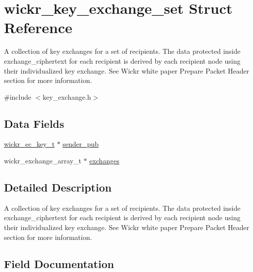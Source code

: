 \hypertarget{structwickr__key__exchange__set}{}\section{wickr\+\_\+key\+\_\+exchange\+\_\+set Struct Reference}
\label{structwickr__key__exchange__set}


A collection of key exchanges for a set of recipients. The data protected inside \textquotesingle{}exchange\+\_\+ciphertext\textquotesingle{} for each recipient is derived by each recipient node using their individualized key exchange. See Wickr white paper \textquotesingle{}Prepare Packet Header\textquotesingle{} section for more information.  




{\ttfamily \#include $<$key\+\_\+exchange.\+h$>$}

\subsection*{Data Fields}
\begin{DoxyCompactItemize}
\item 
\mbox{\hyperlink{structwickr__ec__key}{wickr\+\_\+ec\+\_\+key\+\_\+t}} $\ast$ \mbox{\hyperlink{structwickr__key__exchange__set_ac0b304b3014b3c7bfe181526c2f3fc37}{sender\+\_\+pub}}
\item 
wickr\+\_\+exchange\+\_\+array\+\_\+t $\ast$ \mbox{\hyperlink{structwickr__key__exchange__set_a7e848df6178f2e384e56bfd1f9b6d3b4}{exchanges}}
\end{DoxyCompactItemize}


\subsection{Detailed Description}
A collection of key exchanges for a set of recipients. The data protected inside \textquotesingle{}exchange\+\_\+ciphertext\textquotesingle{} for each recipient is derived by each recipient node using their individualized key exchange. See Wickr white paper \textquotesingle{}Prepare Packet Header\textquotesingle{} section for more information. 

\subsection{Field Documentation}
\mbox{\label{structwickr__key__exchange__set_a7e848df6178f2e384e56bfd1f9b6d3b4}} 
